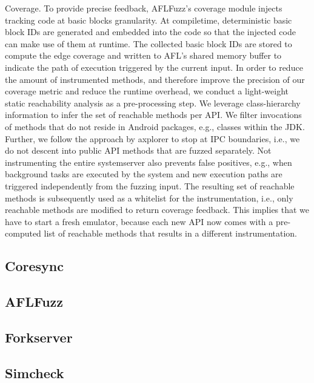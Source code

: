 \documentclass[runningheads]{llncs}
\begin{document}
Coverage. To provide precise feedback, AFLFuzz’s coverage module injects tracking code at basic blocks granularity. At compiletime, deterministic basic block IDs are generated and embedded into the code so that the injected code can make use of them at runtime. The collected basic block IDs are stored to compute the edge coverage and written to AFL’s shared memory buffer to indicate the path of execution triggered by the current input. In order to reduce the amount of instrumented methods, and therefore improve the precision of our coverage metric and reduce the runtime overhead, we conduct a light-weight static reachability analysis as a pre-processing step. We leverage class-hierarchy information to infer the set of reachable methods per API. We filter invocations of methods that do not reside in Android packages, e.g., classes within the JDK. Further, we follow the approach by axplorer \cite{backes2016demystifying} to stop at IPC boundaries, i.e., we do not descent into public API methods that are fuzzed separately. Not instrumenting the entire systemserver also prevents false positives, e.g., when background tasks are executed by the system and new execution paths are triggered independently from the fuzzing input. The resulting set of reachable methods is subsequently used as a whitelist for the instrumentation, i.e., only reachable methods are modified to return coverage feedback. This implies that we have to start a fresh emulator, because each new API now comes with a pre-computed list of reachable methods that results in a different instrumentation.


\subsection{Coresync} %
\subsection{AFLFuzz} %
\subsection{Forkserver} %
\subsection{Simcheck} %
\end{document}

